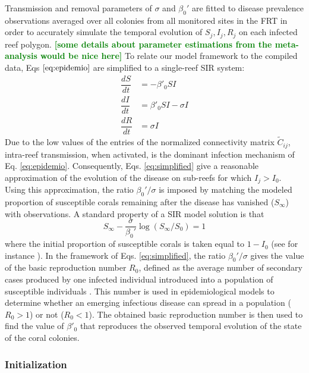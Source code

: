 \documentclass[utf8]{frontiersSCNS}
\newcommand{\erinn}[1]{\textbf{\textcolor{green}{#1}}}
\begin{document}
Transmission and removal parameters of $\sigma$ and $\beta_0'$ are fitted to disease prevalence observations averaged over all colonies from all monitored sites in the FRT in order to accurately simulate the temporal evolution of $S_j,I_j,R_j$ on each infected reef polygon. \erinn{[some details about parameter estimations from the meta-analysis would be nice here]}
To relate our model framework to the compiled data, Eqs $\ref{eq:epidemio}$ are simplified to a single-reef SIR system:
\begin{equation}
    \begin{aligned}
        \dfrac{dS}{dt} &= -\beta'_0SI \\
        \dfrac{dI}{dt} &= \beta'_0SI - \sigma I \\
        \dfrac{dR}{dt} &= \sigma I
    \end{aligned}\label{eq:simplified}
\end{equation}
Due to the low values of the entries of the normalized connectivity matrix $\tilde{C}_{ij}$, intra-reef transmission, when activated, is the dominant infection mechanism of Eq. \ref{eq:epidemio}. Consequently, Eqs. \ref{eq:simplified} give a reasonable approximation of the evolution of the disease on sub-reefs for which $I_j > I_0$. Using this approximation, the ratio $\beta_0'/\sigma$ is imposed by matching the modeled proportion of susceptible corals remaining after the disease has vanished ($S_\infty$) with observations. A standard property of a SIR model solution is that
\begin{equation}
    S_\infty - \frac{\sigma}{\beta_0'}\log(S_{\infty}/S_0) = 1\label{eq:ratio}
\end{equation}
where the initial proportion of susceptible corals is taken equal to $1-I_0$ (see for instance \cite{Murray07}). In the framework of Eqs. \ref{eq:simplified}, the ratio $\beta_0'/\sigma$ gives the value of the basic reproduction number $R_0$, defined as the average number of secondary cases produced by one
infected individual introduced into a population of susceptible individuals \citep{keeling2007stochastic}. This
number is used in epidemiological models to determine whether an emerging infectious disease can spread in a
population ($R_0 > 1$) or not ($R_0 < 1$). The obtained basic reproduction number is then used to find the value of $\beta'_0$ that reproduces the observed temporal evolution of the state of the coral colonies.

\subsubsection{Initialization}
\end{document}
